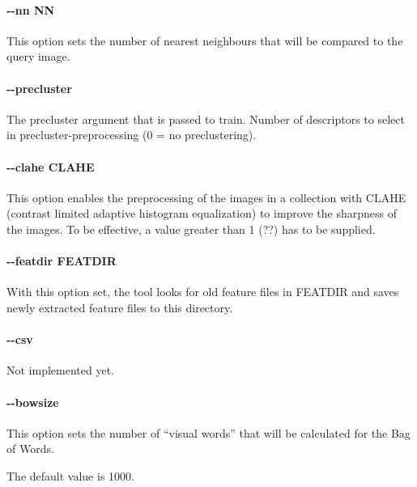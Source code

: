 \paragraph{\ttfamily-{}-nn NN}

This option sets the number of nearest neighbours that will be compared to the query
image. 

\paragraph{\ttfamily-{}-precluster}
The precluster argument that is passed to {\ttfamily train}.
Number of descriptors to select in precluster-preprocessing (0 = no preclustering).

\paragraph{\ttfamily-{}-clahe CLAHE}

This option enables the preprocessing of the images in a collection with CLAHE 
(contrast limited adaptive histogram equalization) to improve the sharpness
of the images. To be effective, a value greater than 1 (??) has to be supplied.


\paragraph{\ttfamily-{}-featdir FEATDIR}

With this option set, the tool looks for old feature files in FEATDIR and saves
newly extracted feature files to this directory.


\paragraph{\ttfamily-{}-csv}

Not implemented yet.

\paragraph{\ttfamily-{}-bowsize}

This option sets the number of ``visual words'' that will be
calculated for the Bag of Words.

The default value is 1000.


